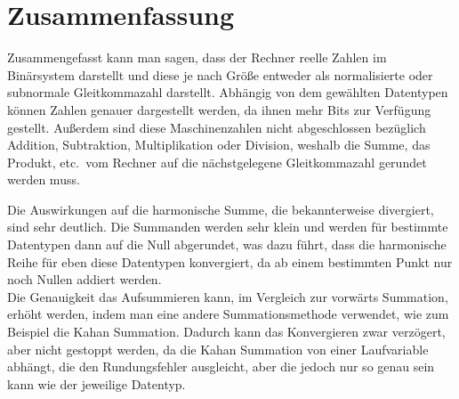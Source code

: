 \documentclass{scrartcl}
\begin{document}
\section{Zusammenfassung}
Zusammengefasst kann man sagen, dass der Rechner reelle Zahlen im Binärsystem
darstellt und diese je nach Größe entweder als normalisierte oder subnormale
Gleitkommazahl darstellt.
Abhängig von dem gewählten Datentypen können Zahlen genauer dargestellt werden,
da ihnen mehr Bits zur Verfügung gestellt.
Außerdem sind diese Maschinenzahlen nicht abgeschlossen bezüglich Addition,
Subtraktion, Multiplikation oder Division, weshalb die Summe, das Produkt,
etc.\ vom Rechner auf die nächstgelegene Gleitkommazahl gerundet werden muss.
\begin{flushleft}
    Die Auswirkungen auf die harmonische Summe, die bekannterweise divergiert, sind
    sehr deutlich.
    Die Summanden werden sehr klein und werden für bestimmte Datentypen dann auf
    die Null abgerundet, was dazu führt, dass die harmonische Reihe für eben diese
    Datentypen konvergiert, da ab einem bestimmten Punkt nur noch Nullen addiert
    werden.
    \\
    Die Genauigkeit das Aufsummieren kann, im Vergleich zur vorwärts Summation, erhöht werden, indem man eine andere
    Summationsmethode verwendet, wie zum Beispiel die Kahan Summation.
    Dadurch kann das Konvergieren zwar verzögert, aber nicht gestoppt werden, da
    die Kahan Summation von einer Laufvariable abhängt, die den Rundungsfehler
    ausgleicht, aber die jedoch nur so genau sein kann wie der jeweilige Datentyp.
\end{flushleft}
\end{document}
